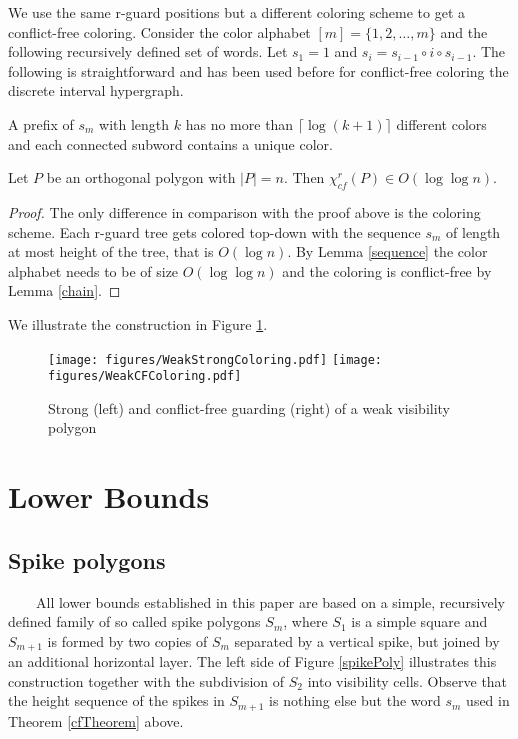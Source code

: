 \documentclass[a4paper,USenglish,numberwithinsect]{lipics}
\theoremstyle{plain}
\begin{document}
We use the same r-guard positions but a different coloring scheme to get a
conflict-free coloring. Consider the color alphabet $[m]=\{1,2,\ldots
,m\}$ and the following recursively defined set of words. Let $s_1=1$
and $s_i=s_{i-1}\circ i\circ s_{i-1}$. The following is straightforward
and has been used before for conflict-free coloring the discrete
interval hypergraph.
\begin{lemma}
\label{sequence}
A prefix of $s_m$ with length $k$ has no more than
$\lceil\log(k+1)\rceil$ different colors and each connected subword contains a unique color.
\end{lemma}



\begin{theorem}
\label{cfTheorem}
Let $P$ be an orthogonal polygon with $|P|=n$. Then 
 $\chi^r_{cf}(P)\in O(\log{\log{n}})$.
\end{theorem}

\begin{proof}
The only difference in comparison with the proof above is the coloring
scheme. Each r-guard tree gets colored top-down with the sequence $s_m$ of
length at most height of the tree, that is $O(\log n)$. By Lemma
\ref{sequence} the color alphabet needs to be of size
$O(\log{\log{n}})$ and the coloring is conflict-free by Lemma \ref{chain}.
\end{proof}

We illustrate the construction in Figure \ref{coveringGuards}.
\begin{figure}
\centering
\texttt{[image: figures/WeakStrongColoring.pdf]}\quad\quad
\texttt{[image: figures/WeakCFColoring.pdf]}
\caption{Strong (left)  and conflict-free guarding (right) of a  weak visibility
polygon}
\label{coveringGuards}
\end{figure}

\section{Lower Bounds}


\subsection{Spike polygons}
\ \ \ \ All lower bounds established in this paper are based on a simple,
recursively defined family of so called
spike polygons $S_m$, where $S_1$ is a simple square and $S_{m+1}$ is
formed by two copies of
$S_m$ separated by a vertical spike, but joined by an additional
horizontal layer.
The left side of Figure \ref{spikePoly}  illustrates this construction
together
with the subdivision of $S_2$ into visibility cells. Observe that the
height sequence of the
spikes in $S_{m+1}$ is nothing else but the word $s_m$ used in Theorem \ref{cfTheorem} above.
\end{document}
